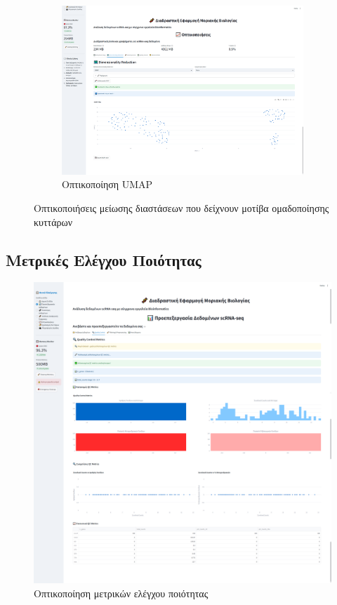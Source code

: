 \documentclass[11pt,a4paper]{article}
\begin{document}
\begin{figure}[H]
\begin{subfigure}{0.45\textwidth}
         \includegraphics[width=1.0\linewidth]{umap.png}
        \caption{Οπτικοποίηση UMAP}
    \end{subfigure}
    \caption{Οπτικοποιήσεις μείωσης διαστάσεων που δείχνουν μοτίβα ομαδοποίησης κυττάρων}
    \label{fig:dimred}
\end{figure}

\subsection{Μετρικές Ελέγχου Ποιότητας}

\begin{figure}[H]
    \centering
   \includegraphics[width=1.0\linewidth]{qc_metrics.png}
    \caption{Οπτικοποίηση μετρικών ελέγχου ποιότητας}
    \label{fig:qc_metrics}
\end{figure}
\end{document}
